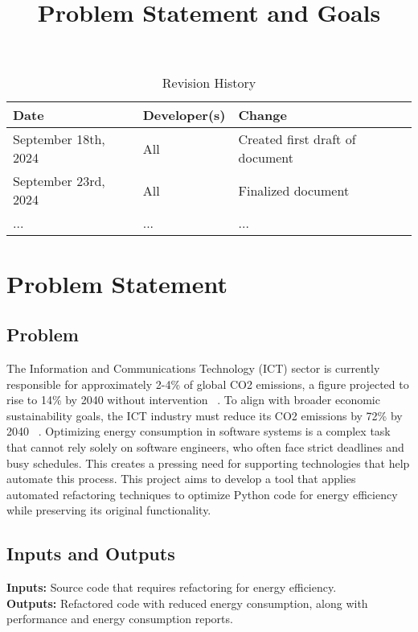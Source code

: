 \documentclass{article}
\title{Problem Statement and Goals\\\progname}
\author{\authname}
\date{}
\begin{document}
\maketitle

\begin{table}[hp]
  \caption{Revision History} \label{TblRevisionHistory}
  \begin{tabularx}{\textwidth}{llX}
    \toprule
    \textbf{Date} & \textbf{Developer(s)} & \textbf{Change}\\
    \midrule
    September 18th, 2024 & All & Created first draft of document\\
    September 23rd, 2024 & All & Finalized document\\
    ... & ... & ...\\
    \bottomrule
  \end{tabularx}
\end{table}

\newpage

\section{Problem Statement}

\subsection{Problem}

The Information and Communications Technology (ICT) sector is
currently responsible for approximately 2-4\% of global CO2
emissions, a figure projected to rise to 14\% by 2040 without
intervention ~\citep{BelkhirAndElmeligi2018}. To align with broader
economic sustainability goals, the ICT industry must reduce its CO2
emissions by 72\% by 2040 ~\citep{FreitagAndBernersLee2021}.
Optimizing energy consumption in software systems is a complex task
that cannot rely solely on software engineers, who often face strict
deadlines and busy schedules. This creates a pressing need for
supporting technologies that help automate this process. This project
aims to develop a tool that applies automated refactoring techniques
to optimize Python code for energy efficiency while preserving its
original functionality.

\subsection{Inputs and Outputs}

\textbf{Inputs:} Source code that requires refactoring for energy efficiency. \\
\textbf{Outputs:} Refactored code with reduced energy consumption,
along with performance and energy consumption reports.
\end{document}
